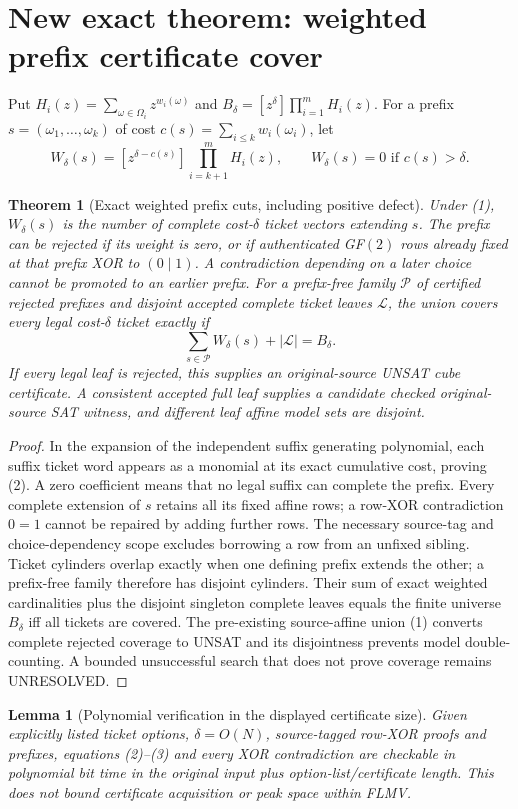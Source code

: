 \documentclass[11pt]{article}
\newtheorem{theorem}{Theorem}
\newtheorem{lemma}{Lemma}
\begin{document}
\section{New exact theorem: weighted prefix certificate cover}
Put $H_i(z)=\sum_{\omega\in\Omega_i}z^{w_i(\omega)}$ and $B_\delta=[z^\delta]\prod_{i=1}^mH_i(z)$. For a prefix $s=(\omega_1,\ldots,\omega_k)$ of cost $c(s)=\sum_{i\le k}w_i(\omega_i)$, let
\[
W_\delta(s)=[z^{\delta-c(s)}]\prod_{i=k+1}^mH_i(z),
\qquad W_\delta(s)=0\text{ if }c(s)>\delta. \tag{2}
\]
\begin{theorem}[Exact weighted prefix cuts, including positive defect]
Under (1), $W_\delta(s)$ is the number of complete cost-$\delta$ ticket vectors extending $s$. The prefix can be rejected if its weight is zero, or if authenticated GF$(2)$ rows \emph{already fixed at that prefix} XOR to $(0\mid1)$. A contradiction depending on a later choice cannot be promoted to an earlier prefix. For a prefix-free family $\mathcal P$ of certified rejected prefixes and disjoint accepted complete ticket leaves $\mathcal L$, the union covers every legal cost-$\delta$ ticket exactly if
\[
\sum_{s\in\mathcal P}W_\delta(s)+|\mathcal L|=B_\delta. \tag{3}
\]
If every legal leaf is rejected, this supplies an original-source UNSAT cube certificate. A consistent accepted full leaf supplies a candidate checked original-source SAT witness, and different leaf affine model sets are disjoint.
\end{theorem}
\begin{proof}
In the expansion of the independent suffix generating polynomial, each suffix ticket word appears as a monomial at its exact cumulative cost, proving (2). A zero coefficient means that no legal suffix can complete the prefix. Every complete extension of $s$ retains all its fixed affine rows; a row-XOR contradiction $0=1$ cannot be repaired by adding further rows. The necessary source-tag and choice-dependency scope excludes borrowing a row from an unfixed sibling. Ticket cylinders overlap exactly when one defining prefix extends the other; a prefix-free family therefore has disjoint cylinders. Their sum of exact weighted cardinalities plus the disjoint singleton complete leaves equals the finite universe $B_\delta$ iff all tickets are covered. The pre-existing source-affine union (1) converts complete rejected coverage to UNSAT and its disjointness prevents model double-counting. A bounded unsuccessful search that does not prove coverage remains UNRESOLVED.
\end{proof}
\begin{lemma}[Polynomial verification in the displayed certificate size]
Given explicitly listed ticket options, $\delta=O(N)$, source-tagged row-XOR proofs and prefixes, equations (2)--(3) and every XOR contradiction are checkable in polynomial bit time in the original input plus option-list/certificate length. This does not bound certificate acquisition or peak space within FLMV.
\end{lemma}
\end{document}
